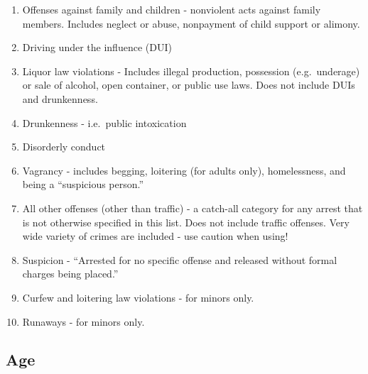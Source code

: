 \documentclass[
  12pt,
  openany]{book}
\providecommand{\tightlist}{%
  \setlength{\itemsep}{0pt}\setlength{\parskip}{0pt}}
\begin{document}
\begin{enumerate}
\def\labelenumi{\arabic{enumi}.}
\setcounter{enumi}{19}
\tightlist
\item
  Offenses against family and children - nonviolent acts against family members. Includes neglect or abuse, nonpayment of child support or alimony.
\item
  Driving under the influence (DUI)
\item
  Liquor law violations - Includes illegal production, possession (e.g.~underage) or sale of alcohol, open container, or public use laws. Does not include DUIs and drunkenness.
\item
  Drunkenness - i.e.~public intoxication
\item
  Disorderly conduct
\item
  Vagrancy - includes begging, loitering (for adults only), homelessness, and being a ``suspicious person.''
\item
  All other offenses (other than traffic) - a catch-all category for any arrest that is not otherwise specified in this list. Does not include traffic offenses. Very wide variety of crimes are included - use caution when using!
\item
  Suspicion - ``Arrested for no specific offense and released without formal charges being placed.''
\item
  Curfew and loitering law violations - for minors only.
\item
  Runaways - for minors only.
\end{enumerate}

\hypertarget{age}{%
\subsection{Age}\label{age}}
\end{document}
